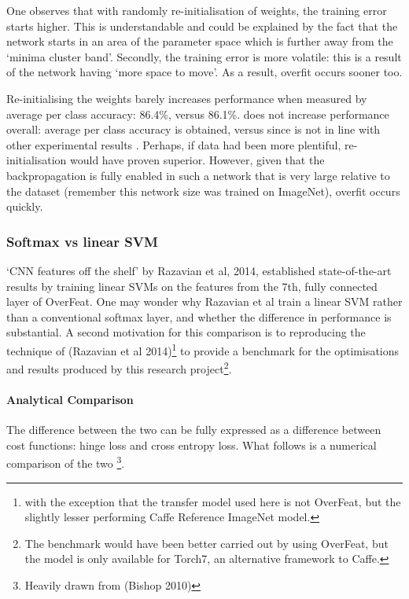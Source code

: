 \documentclass[a4paper,11pt]{article}
\begin{document}
One observes that with randomly re-initialisation of weights, the training error starts higher. This is understandable and could be explained by the fact that the network starts in an area of the parameter space which is further away from the `minima cluster band'. Secondly, the training error is more volatile: this is a result of the network having `more space to move'. As a result, overfit occurs sooner too. 

Re-initialising the weights barely increases performance when measured by average per class accuracy: 86.4\%, versus 86.1\%. does not increase performance overall:  average per class accuracy is obtained, versus since is not in line with other experimental results \cite{transfer-learning}. Perhaps, if data had been more plentiful, re-initialisation would have proven superior. However, given that the backpropagation is fully enabled in such a network that is very large relative to the dataset (remember this network size was trained on ImageNet), overfit occurs quickly.


\subsubsection{Softmax vs linear SVM}

`CNN features off the shelf' by Razavian et al, 2014, \cite{off-the-shelf} established state-of-the-art results by training linear SVMs on the features from the 7th, fully connected layer of OverFeat. One may wonder why Razavian et al train a linear SVM rather than a conventional softmax layer, and whether the difference in performance is substantial. A second motivation for this comparison is to reproducing the technique of (Razavian et al 2014)\footnote{with the exception that the transfer model used here is not OverFeat, but the slightly lesser performing Caffe Reference ImageNet model.} to provide a benchmark for the optimisations and results produced by this research project\footnote{The benchmark would have been better carried out by using OverFeat, but the model is only available for Torch7, an alternative framework to Caffe.}.

\paragraph{Analytical Comparison}
The difference between the two can be fully expressed as a difference between cost functions\cite{ML-book}: hinge loss and cross entropy loss. What follows is a numerical comparison of the two \footnote{Heavily drawn from (Bishop 2010)}. 
\end{document}
